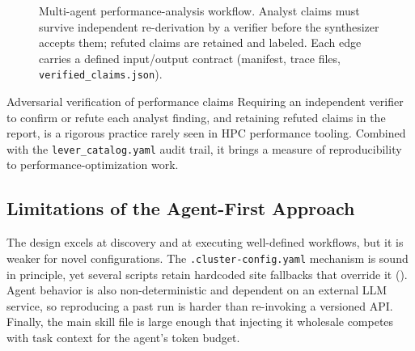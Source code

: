 \documentclass[11pt]{article}
\newcommand{\file}[1]{\texttt{\small #1}}
\begin{document}
\begin{figure}[ht]
\centering
{}
\caption{Multi-agent performance-analysis workflow. Analyst claims must survive
independent re-derivation by a verifier before the synthesizer accepts them; refuted
claims are retained and labeled. Each edge carries a defined input/output contract
(manifest, trace files, \file{verified\_claims.json}).}
\label{fig:perfdag}
\end{figure}

\begin{strength}{Adversarial verification of performance claims}
Requiring an independent verifier to confirm or refute each analyst finding, and
retaining refuted claims in the report, is a rigorous practice rarely seen in HPC
performance tooling. Combined with the \file{lever\_catalog.yaml} audit trail, it
brings a measure of reproducibility to performance-optimization work.
\end{strength}

\subsection{Limitations of the Agent-First Approach}
The design excels at discovery and at executing well-defined workflows, but it is
weaker for novel configurations. The \file{.cluster-config.yaml} mechanism is sound
in principle, yet several scripts retain hardcoded site fallbacks that override it
(). Agent behavior is also non-deterministic and dependent on an
external LLM service, so reproducing a past run is harder than re-invoking a versioned
API. Finally, the main skill file is large enough that injecting it wholesale competes
with task context for the agent's token budget.
\end{document}
